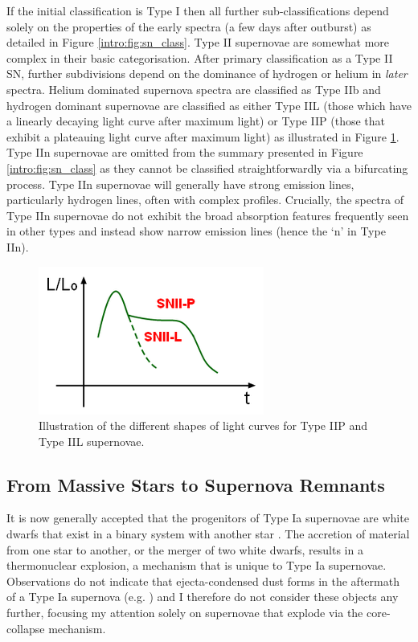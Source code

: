 If the initial classification is Type I then all further sub-classifications depend solely on the properties of the early spectra (a few days after outburst) as detailed in Figure \ref{intro:fig:sn_class}.  Type II supernovae are somewhat more complex in their basic categorisation.  After primary classification as a Type II SN, further subdivisions depend on the dominance of hydrogen or helium in \textit{later} spectra.  Helium dominated supernova spectra are classified as Type IIb and hydrogen dominant supernovae are classified as either Type IIL (those which have a linearly decaying light curve after maximum light) or Type IIP (those that exhibit a plateauing light curve after maximum light) as illustrated in Figure \ref{fig:light_curves}.  Type IIn supernovae are omitted from the summary presented in Figure \ref{intro:fig:sn_class} as they cannot be classified straightforwardly via a bifurcating process.  Type IIn supernovae will generally have strong emission lines, particularly hydrogen lines, often with complex profiles.  Crucially, the spectra of Type IIn supernovae do not exhibit the broad absorption features frequently seen in other types and instead show narrow emission lines (hence the `n' in Type IIn).  

\begin{figure}
\centering
\includegraphics[clip=true, scale = 1, trim=0 0 0 0]{chapters/chapter1/figs/light_curves.png}
\caption{Illustration of the different shapes of light curves for Type IIP and Type IIL supernovae.}
\label{fig:light_curves}
\end{figure}

\subsection{From Massive Stars to Supernova Remnants}

It is now generally accepted that the progenitors of Type Ia supernovae are white dwarfs that exist in a binary system with another star \citep{Wang2012}.  The accretion of material from one star to another, or the merger of two white dwarfs, results in a thermonuclear explosion, a mechanism that is unique to Type Ia supernovae.   Observations do not indicate that ejecta-condensed dust forms in the aftermath of a Type Ia supernova (e.g. \citealt{Gomez2012a}) and I therefore do not consider these objects any further, focusing my attention solely on supernovae that explode via the core-collapse mechanism.  

